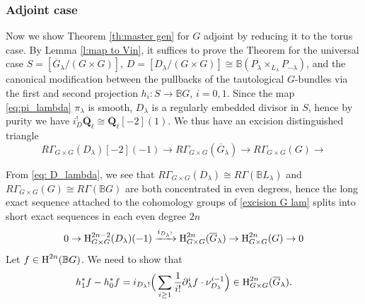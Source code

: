 \documentclass[reqno]{amsart}
\numberwithin{equation}{subsection}
\theoremstyle{definition}
\def\BB{\mathbb{B}}
\newcommand{\der}{\textup{der}}
\newcommand\upH{\textup{H}}
\newcommand{\Qlbar}{\overline{\Q}_\ell}
\newcommand{\wt}[1]{\widetilde{#1}}
\newcommand{\ov}{\overline}
\newcommand{\cohog}[2]{\textup{H}^{#1}({#2})}     %
\newcommand\xr{\xrightarrow}
\newcommand\G\Gamma
\renewcommand{\l}{\lambda}
\newcommand\pl{\partial}
\newcommand{\Q}{\mathbf{Q}}
\begin{document}

\subsubsection{Adjoint case}
Now we show Theorem \ref{th:master gen} for $G$ adjoint by reducing it to the torus case. By Lemma \ref{l:map to Vin}, it suffices to prove the Theorem for the universal case $S=[\ov G_{\l}/(G\times G)]$, $D=[D_{\l}/(G\times G)]\cong \BB(P_{\l}\times_{L_{\l}}P_{-\l})$, and the canonical modification between the pullbacks of the tautological $G$-bundles via the first and second projection $h_{i}: S\to \BB G$, $i=0,1$. Since the map \eqref{eq:pi_lambda} $\pi_{\l}$ is smooth, $D_{\l}$ is a regularly embedded divisor in $S$, hence by purity we have $i_{D}^{!}\Qlbar\cong \Qlbar[-2](1)$. We thus have an excision distinguished triangle
\begin{equation}\label{excision G lam}
R\G_{G\times G}(D_{\l})[-2](-1)\to R\G_{G\times G}(\ov G_{\l})\to R\G_{G\times G}(G)\to 
\end{equation}

From \eqref{eq: D_lambda}, we see that $R\G_{G\times G}(D_{\l})\cong R\G(\BB L_{\l})$ and $R\G_{G\times G}(G)\cong R\G(\BB G)$ are both concentrated in even degrees, hence the long exact sequence attached to the cohomology groups of \eqref{excision G lam} splits into short exact sequences in each even degree $2n$
\begin{equation}\label{shex G}
0\to \upH^{2n-2}_{G\times G}(D_{\l})(-1)\xr{i_{D_{\l}!}} \upH^{2n}_{G\times G}(\ov G_{\l})\to \upH^{2n}_{G\times G}(G)\to 0
\end{equation}
Let $f\in \cohog{2n}{\BB G}$. We need to show that 
\begin{equation}\label{master eqn univ}
h_{1}^{*}f-h_{0}^{*}f=i_{D_{\l}!}\Big(\sum_{i\ge1}\frac{1}{i!}\pl^{i}_{\l}f\cdot \nu_{D_{\l}}^{i-1}\Big)\in \upH^{2n}_{G\times G}(\ov G_{\l}).
\end{equation}
\end{document}
